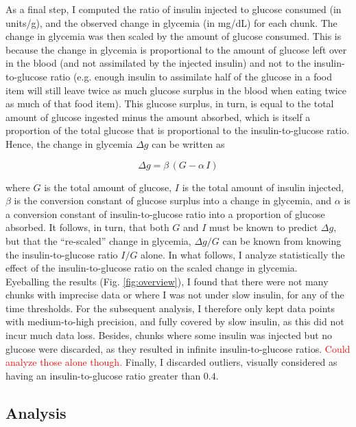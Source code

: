 As a final step, I computed the ratio of insulin injected to glucose consumed (in units/g), and the observed change in glycemia (in mg/dL) for each chunk.
The change in glycemia was then scaled by the amount of glucose consumed.
This is because the change in glycemia is proportional to the amount of glucose left over in the blood (and not assimilated by the injected insulin) and not to the insulin-to-glucose ratio (e.g. enough insulin to assimilate half of the glucose in a food item will still leave twice as much glucose surplus in the blood when eating twice as much of that food item).
This glucose surplus, in turn, is equal to the total amount of glucose ingested minus the amount absorbed, which is itself a proportion of the total glucose that is proportional to the insulin-to-glucose ratio.
Hence, the change in glycemia $\Delta g$ can be written as

\begin{equation}
    \Delta g = \beta \, (G - \alpha \, I)
    \label{eq:delta_g}
\end{equation}

\noindent where $G$ is the total amount of glucose, $I$ is the total amount of insulin injected, $\beta$ is the conversion constant of glucose surplus into a change in glycemia, and $\alpha$ is a conversion constant of insulin-to-glucose ratio into a proportion of glucose absorbed.
It follows, in turn, that both $G$ and $I$ must be known to predict $\Delta g$, but that the ``re-scaled'' change in glycemia, $\Delta g / G$ can be known from knowing the insulin-to-glucose ratio $I / G$ alone.
In what follows, I analyze statistically the effect of the insulin-to-glucose ratio on the scaled change in glycemia.\\ 

Eyeballing the results (Fig. \ref{fig:overview}), I found that there were not many chunks with imprecise data or where I was not under slow insulin, for any of the time thresholds.
For the subsequent analysis, I therefore only kept data points with medium-to-high precision, and fully covered by slow insulin, as this did not incur much data loss.
Besides, chunks where some insulin was injected but no glucose were discarded, as they resulted in infinite insulin-to-glucose ratios.
\textcolor{red}{Could analyze those alone though.}
Finally, I discarded outliers, visually considered as having an insulin-to-glucose ratio greater than $0.4$.

\subsection*{Analysis}

